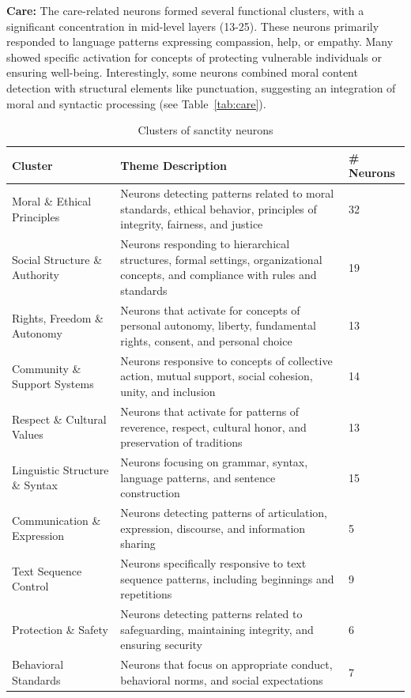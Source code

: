 \documentclass[runninghheads]{llncs}
\begin{document}
\textbf{Care:} The care-related neurons formed several functional clusters, with a significant concentration in mid-level layers (13-25). These neurons primarily responded to language patterns expressing compassion, help, or empathy. Many showed specific activation for concepts of protecting vulnerable individuals or ensuring well-being. Interestingly, some neurons combined moral content detection with structural elements like punctuation, suggesting an integration of moral and syntactic processing (see Table~\ref{tab:care}).






\begin{table}[!tb]
    \centering
    \begin{tabular}{|p{3cm}|p{8cm}|p{1cm}|}
    \hline
        Cluster & Theme Description & \# Neurons \\ \hline
        Moral \& Ethical Principles & Neurons detecting patterns related to moral standards, ethical behavior, principles of integrity, fairness, and justice & 32 \\ \hline
        Social Structure \& Authority & Neurons responding to hierarchical structures, formal settings, organizational concepts, and compliance with rules and standards & 19 \\ \hline
        Rights, Freedom \& Autonomy & Neurons that activate for concepts of personal autonomy, liberty, fundamental rights, consent, and personal choice & 13 \\ \hline
        Community \& Support Systems & Neurons responsive to concepts of collective action, mutual support, social cohesion, unity, and inclusion & 14 \\ \hline
        Respect \& Cultural Values & Neurons that activate for patterns of reverence, respect, cultural honor, and preservation of traditions & 13 \\ \hline
        Linguistic Structure \& Syntax & Neurons focusing on grammar, syntax, language patterns, and sentence construction & 15 \\ \hline
        Communication \& Expression & Neurons detecting patterns of articulation, expression, discourse, and information sharing & 5\\ \hline
        Text Sequence Control & Neurons specifically responsive to text sequence patterns, including beginnings and repetitions & 9 \\ \hline
        Protection \& Safety & Neurons detecting patterns related to safeguarding, maintaining integrity, and ensuring security & 6 \\ \hline
        Behavioral Standards & Neurons that focus on appropriate conduct, behavioral norms, and social expectations & 7 \\ \hline
    \end{tabular}
    \caption{Clusters of sanctity neurons}
    \label{tab:sanctity}
\end{table}
\end{document}
